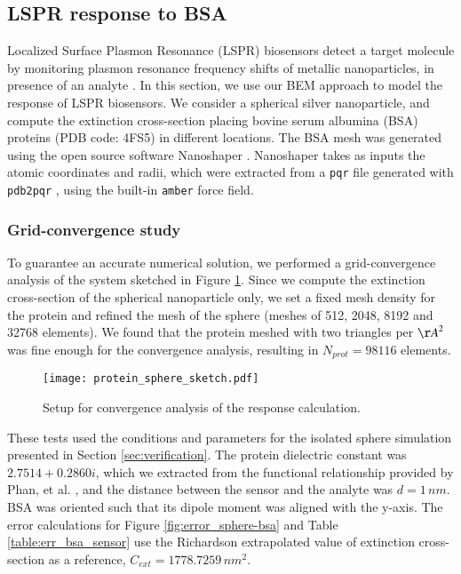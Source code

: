 \subsection{LSPR response to BSA} \label{sec:lspr_response}

Localized Surface Plasmon Resonance (LSPR) biosensors detect a target molecule by monitoring
plasmon resonance frequency shifts of metallic nanoparticles, in presence of an analyte \cite{WilletsVandyune2007}.
In this section, we use our BEM approach to model the response of LSPR biosensors.
We consider a spherical silver nanoparticle, and compute the extinction cross-section placing 
bovine serum albumina (BSA) proteins (PDB code: 4FS5) in different locations.
The BSA mesh was generated using the open source software Nanoshaper \cite{Nanoshaper}. 
Nanoshaper takes as inputs the atomic coordinates and radii, which were 
extracted from a \texttt{pqr} file generated with \texttt{pdb2pqr} \cite{Dolinsky04},
 using the built-in \texttt{amber} force field.

\subsubsection{Grid-convergence study} \label{sec:bsa_convergence}
To guarantee an accurate numerical solution, we performed a grid-convergence 
analysis of the system sketched in Figure \ref{fig:setup_conv}. 
Since we compute the extinction cross-section of the spherical nanoparticle only, we 
set a fixed mesh density for the protein and refined the mesh of the
sphere (meshes of 512, 2048, 8192 and 32768 elements). We found that the protein meshed with two
triangles per ${\AA}^2$ was fine enough for the convergence analysis, resulting in $N_{prot} = 98116$ elements. 


\begin{figure}[h] %
   \centering
   \texttt{[image: protein\_sphere\_sketch.pdf]} 
   \caption{Setup for convergence analysis of the response calculation.}
   \label{fig:setup_conv}
\end{figure}

These tests used the conditions and parameters for the isolated sphere simulation
presented in Section \ref{sec:verification}. The protein dielectric constant was
$2.7514 + 0.2860i$, which we extracted from the 
functional relationship provided by Phan, et al. \cite{PhanETal2013}, and the 
distance between the sensor and the analyte was $d=1 \, nm$. BSA was oriented such that
its dipole moment was aligned with the y-axis. The error calculations for Figure \ref{fig:error_sphere-bsa}
and Table \ref{table:err_bsa_sensor} use the Richardson extrapolated value of extinction cross-section as a
reference, $C_{ext}= 1778.7259 \, nm^2$.


